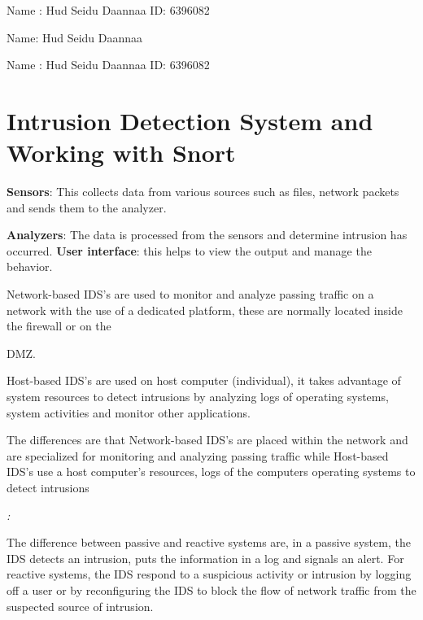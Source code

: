 \documentclass{article} %
\begin{document}


\noindent 

\noindent 

\noindent 

\noindent 

\noindent Name : Hud Seidu Daannaa  ID: 6396082

\noindent Name: Hud Seidu Daannaa  

\noindent Name : Hud Seidu Daannaa  ID: 6396082

\noindent 
\section{Intrusion Detection System and Working with Snort}

\noindent \textit{}\underbar{}

\noindent \textbf{Sensors}: This collects data from various sources such as files, network packets and sends them to the analyzer.

\noindent \textbf{Analyzers}: The data is processed from the sensors and determine intrusion has occurred. \textbf{User interface}: this helps to view the output and manage the behavior.

\noindent \textit{}\underbar{}

\noindent Network-based IDS's are used to monitor and analyze passing traffic on a network with the use of a dedicated platform, these are normally located inside the firewall or on the 

\noindent DMZ.

\noindent Host-based IDS's are used on host computer (individual), it takes advantage of system resources to detect intrusions by analyzing logs of operating systems, system activities and monitor other applications.

\noindent The differences are that Network-based IDS's are placed within the network and are specialized for monitoring and analyzing passing traffic while Host-based IDS's use a host computer's resources, logs of the computers operating systems to detect intrusions

\noindent \textit{:}

\noindent The difference between passive and reactive systems are, in a passive system, the IDS detects an intrusion, puts the information in a log and signals an alert. For reactive systems, the IDS respond to a suspicious activity or intrusion by logging off a user or by reconfiguring the IDS to block the flow of network traffic from the suspected source of intrusion.
\end{document}
